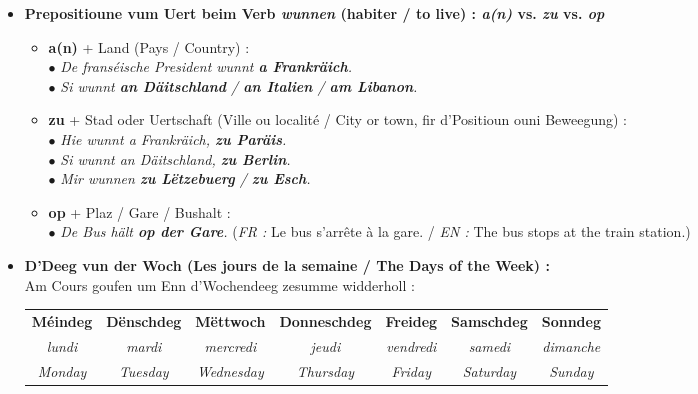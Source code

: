 \begin{itemize}
    \item \textbf{Prepositioune vum Uert beim Verb \textit{wunnen} (habiter / to live) : \textit{a(n)} vs. \textit{zu} vs. \textit{op}}
    \begin{itemize}
        \item \textbf{a(n)} + Land (Pays / Country) : \\
        $\bullet$ \textit{De franséische President wunnt \textbf{a Frankräich}.} \\
        $\bullet$ \textit{Si wunnt \textbf{an Däitschland} / \textbf{an Italien} / \textbf{am Libanon}.}
        \item \textbf{zu} + Stad oder Uertschaft (Ville ou localité / City or town, fir d'Positioun ouni Beweegung) : \\
        $\bullet$ \textit{Hie wunnt a Frankräich, \textbf{zu Paräis}.} \\
        $\bullet$ \textit{Si wunnt an Däitschland, \textbf{zu Berlin}.} \\
        $\bullet$ \textit{Mir wunnen \textbf{zu Lëtzebuerg} / \textbf{zu Esch}.}
        \item \textbf{op} + Plaz / Gare / Bushalt : \\
        $\bullet$ \textit{De Bus hält \textbf{op der Gare}.} (\textit{FR :} Le bus s'arrête à la gare. / \textit{EN :} The bus stops at the train station.)
    \end{itemize}

    \vspace{0.3em}

    \item \textbf{D'Deeg vun der Woch (Les jours de la semaine / The Days of the Week) :} \\
    Am Cours goufen um Enn d'Wochendeeg zesumme widderholl :
    \begin{center}
        \begin{tabular}{ccccccc}
            \toprule
            \textbf{Méindeg} & \textbf{Dënschdeg} & \textbf{Mëttwoch} & \textbf{Donneschdeg} & \textbf{Freideg} & \textbf{Samschdeg} & \textbf{Sonndeg} \\
            \footnotesize\textit{lundi} & \footnotesize\textit{mardi} & \footnotesize\textit{mercredi} & \footnotesize\textit{jeudi} & \footnotesize\textit{vendredi} & \footnotesize\textit{samedi} & \footnotesize\textit{dimanche} \\
            \footnotesize\textit{Monday} & \footnotesize\textit{Tuesday} & \footnotesize\textit{Wednesday} & \footnotesize\textit{Thursday} & \footnotesize\textit{Friday} & \footnotesize\textit{Saturday} & \footnotesize\textit{Sunday} \\
            \bottomrule
        \end{tabular}
    \end{center}
\end{itemize}


